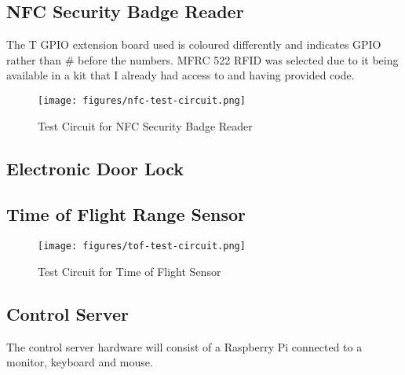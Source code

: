 \subsection{NFC Security Badge Reader}

The T GPIO extension board used is coloured differently and indicates GPIO
rather than \# before the numbers. MFRC 522 RFID was selected due to it being
available in a kit that I already had access to and having provided code. 

\begin{figure}[!htb]
\centering
\texttt{[image: figures/nfc-test-circuit.png]}
\caption{Test Circuit for NFC Security Badge Reader}
\label{fig:nfc-test-circuit}
\end{figure}

\subsection{Electronic Door Lock}

\subsection{Time of Flight Range Sensor}

\begin{figure}[!htb]
\centering
\texttt{[image: figures/tof-test-circuit.png]}
\caption{Test Circuit for Time of Flight Sensor}
\label{fig:tof-test-circuit}
\end{figure}


\subsection{Control Server}

The control server hardware will consist of a Raspberry Pi connected to a
monitor, keyboard and mouse.

